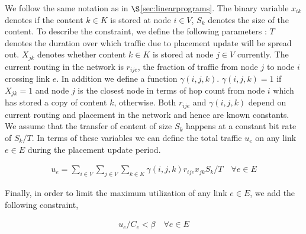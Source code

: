 We follow the same notation as in $\S$\ref{sec:linearprograms}. The binary variable $x_{ik}$ denotes if the content $k \in K$ is stored at node $i \in V$, $S_k$  denotes the size of the content.  
To describe the constraint, we  define the following parameters :  $T$ denotes the duration over which traffic due to placement update will be spread out.   $X_{jk}$ denotes whether content $k \in K$ is stored at node $j \in V$ currently. The current routing in the network is $r_{ije}$,  the fraction of traffic  from node $j$ to node $i$ crossing link $e$.  In addition we define a function  $\gamma(i, j, k)$.  $\gamma(i, j, k) = 1$  if $X_{jk} = 1$ and node $j$ is the closest node in terms of hop count from node $i$ which has stored a copy of content $k$, otherwise.  Both $r_{ije}$ and $\gamma(i, j, k)$ depend on current routing and placement in the network and hence are known constants.
We assume that the transfer of content of size $S_k$ happens at a constant bit rate of $S_k/T$. In terms of these variables we can define the total traffic  $u_e $ on any link $e \in E$ during the placement update period. 

\begin{eqnarray}
u_e = \sum_{i \in V}  \sum_{j \in V}  \sum_{k \in K}  \gamma(i, j, k) r_{ije}  x_{jk} S_k / T \quad \forall e \in E
\end{eqnarray}

Finally, in order to limit the maximum utilization of any link $e \in E$, we add the following constraint, 

\begin{eqnarray}
 u_e /C_e < \beta \quad \forall e \in E
\end{eqnarray}






